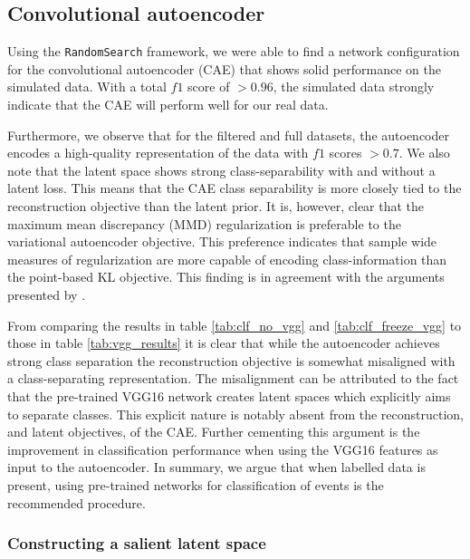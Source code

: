 \subsection{Convolutional autoencoder}

Using the \lstinline{RandomSearch} framework, we were able to find a network configuration for the convolutional autoencoder (CAE) that shows solid performance on the simulated data. With a total $f1$ score of $>0.96$, the simulated data strongly indicate that the CAE will perform well for our real data.

 Furthermore, we observe that for the filtered and full datasets, the autoencoder encodes a high-quality representation of the data with $f1$ scores $>0.7$. We also note that the latent space shows strong class-separability with and without a latent loss. This means that the CAE class separability is more closely tied to the reconstruction objective than the latent prior. It is, however, clear that the maximum mean discrepancy (MMD) regularization is preferable to the variational autoencoder objective. This preference indicates that sample wide measures of regularization are more capable of encoding class-information than the point-based KL objective. This finding is in agreement with the arguments presented by \citet{Zhao}. 

 From comparing the results in table \ref{tab:clf_no_vgg} and \ref{tab:clf_freeze_vgg} to those in table \ref{tab:vgg_results} it is clear that while the autoencoder achieves strong class separation the reconstruction objective is somewhat misaligned with a class-separating representation. The misalignment can be attributed to the fact that the pre-trained VGG16 network creates latent spaces which explicitly aims to separate classes. This explicit nature is notably absent from the reconstruction, and latent objectives, of the CAE. Further cementing this argument is the improvement in classification performance when using the VGG16 features as input to the autoencoder. In summary, we argue that when labelled data is present, using pre-trained networks for classification of events is the recommended procedure.

\subsubsection{Constructing a salient latent space}

